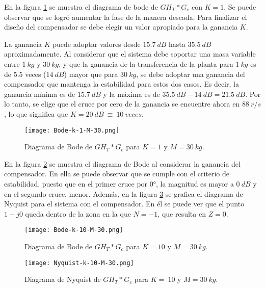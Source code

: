 \noindent En la figura \ref{fig:bode-analog-compensado-para-k-1} se muestra el diagrama de bode de ${GH}_T*G_c$ con $K=1$. Se puede observar que se logró aumentar la fase de la manera deseada. Para finalizar el diseño del compensador se debe elegir un valor apropiado para la ganancia $K$.

La ganancia $K$ puede adoptar valores desde $15.7\:dB$ hasta $35.5\:dB$ aproximadamente. Al considerar que el sistema debe soportar una masa variable entre $1\:kg$ y $30\:kg$, y que la ganancia de la transferencia de la planta para $1\:kg$ es de $5.5$ veces ($14\:dB$) mayor que para $30\:kg$, se debe adoptar una ganancia del compensador que mantenga la estabilidad para estos dos casos. Es decir, la ganancia mínima es de $15.7\:dB$ y la máxima es de $35.5\:dB - 14\:dB = 21.5\:dB$. Por lo tanto, se elige que el cruce por cero de la ganancia se encuentre ahora en $88\:r/s$, lo que significa que $K=20\:dB\ \equiv \ 10\: veces$. 


\begin{figure}[H]
	\centering
	\texttt{[image: Bode-k-1-M-30.png]}
	\caption{Diagrama de Bode de $GH_T*G_c$ para $K=1$ y $M=30\:kg$.}
	\label{fig:bode-analog-compensado-para-k-1}
\end{figure}

\noindent En la figura \ref{fig:bode-analog-compensado-para-k-10} se muestra el diagrama de Bode al considerar la ganancia del compensador. En ella se puede observar que se  cumple con el criterio de estabilidad, puesto que en el primer cruce por 0°, la magnitud es mayor a $0\:dB$ y en el segundo cruce, menor. Además, en la figura \ref{fig:nyquist-analog-para-k-10} se grafica el diagrama de Nyquist para el sistema con el compensador. En él se puede ver que el punto $1+j0$ queda dentro de la zona en la que $N=-1$, que resulta en $Z=0$.

\begin{figure}[H]
	\centering
	\texttt{[image: Bode-k-10-M-30.png]}
	\caption{Diagrama de Bode de $GH_{T}*G_c$ para $K=10$ y $M=30\:kg$.}
	\label{fig:bode-analog-compensado-para-k-10}
\end{figure}

\begin{figure}[H]
	\centering
	\texttt{[image: Nyquist-k-10-M-30.png]}
	\caption{Diagrama de Nyquist de $GH_T*G_c$ para $K=\:10$ y $M=30\:kg$.}
	\label{fig:nyquist-analog-para-k-10}
\end{figure}


